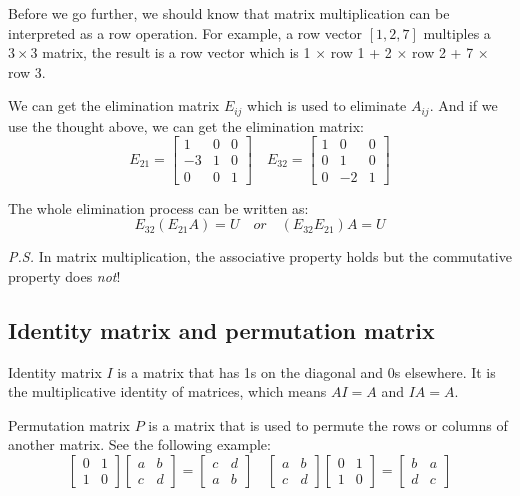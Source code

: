 \documentclass[10pt,a4paper,oneside,numbers=noenddot]{scrbook}
\theoremstyle{ctplain}
\theoremstyle{ctresult}
\begin{document}
Before we go further, we should know that matrix multiplication can be interpreted as
a row operation. For example, a row vector $[1, 2, 7]$ multiples a $3 \times 3$ matrix,
the result is a row vector which is 1 $\times$ row 1 + 2 $\times$ row 2 + 7 $\times$
row 3.

We can get the elimination matrix $E_{ij}$ which is used to eliminate $A_{ij}$. And if
we use the thought above, we can get the elimination matrix:
\[
  E_{21} = \begin{bmatrix}
    1 & 0 & 0 \\
    -3 & 1 & 0 \\
    0 & 0 & 1
  \end{bmatrix}
  \quad
  E_{32} = \begin{bmatrix}
    1 & 0 & 0 \\
    0 & 1 & 0 \\
    0 & -2 & 1
  \end{bmatrix}
\]

The whole elimination process can be written as:
\[
  E_{32} (E_{21} A) = U \quad or \quad (E_{32} E_{21}) A = U
\]

\emph{P.S.} In matrix multiplication, the associative property holds but the
commutative property does \emph{not}!

\subsection{Identity matrix and permutation matrix}

Identity matrix $I$ is a matrix that has 1s on the diagonal and 0s elsewhere. It is
the multiplicative identity of matrices, which means $AI = A$ and $IA = A$.

Permutation matrix $P$ is a matrix that is used to permute the rows or columns of
another matrix. See the following example:
\[
  \begin{bmatrix}
    0 & 1 \\
    1 & 0
  \end{bmatrix}
  \begin{bmatrix}
    a & b \\
    c & d
  \end{bmatrix}
  =
  \begin{bmatrix}
    c & d \\
    a & b
  \end{bmatrix}
  \quad
  \begin{bmatrix}
    a & b \\
    c & d
  \end{bmatrix}
  \begin{bmatrix}
    0 & 1 \\
    1 & 0
  \end{bmatrix}
  =
  \begin{bmatrix}
    b & a \\
    d & c
  \end{bmatrix}
\]
\end{document}
